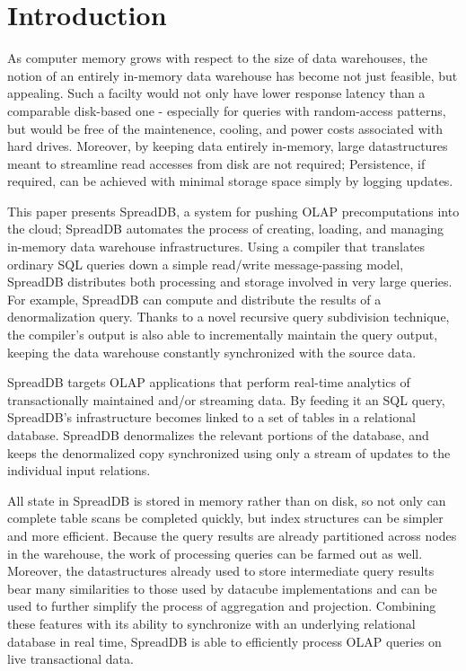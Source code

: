 \section{Introduction}

As computer memory grows with respect to the size of data warehouses, the notion of an entirely in-memory data warehouse has become not just feasible, but appealing.  Such a facilty would not only have lower response latency than a comparable disk-based one - especially for queries with random-access patterns, but would be free of the maintenence\cite{}, cooling\cite{}, and power\cite{1154557} costs associated with hard drives.  Moreover, by keeping data entirely in-memory, large datastructures meant to streamline read accesses from disk are not required; Persistence, if required, can be achieved with minimal storage space simply by logging updates.

This paper presents SpreadDB, a system for pushing OLAP precomputations into the cloud; SpreadDB automates the process of creating, loading, and managing in-memory data warehouse infrastructures.  Using a compiler that translates ordinary SQL queries down a simple read/write message-passing model, SpreadDB distributes both processing and storage involved in very large queries.  For example, SpreadDB can compute and distribute the results of a denormalization query.  Thanks to a novel recursive query subdivision technique, the compiler's output is also able to incrementally maintain the query output, keeping the data warehouse constantly synchronized with the source data.

SpreadDB targets OLAP applications that perform real-time analytics of transactionally maintained and/or streaming data.  By feeding it an SQL query, SpreadDB's infrastructure becomes linked to a set of tables in a relational database.  SpreadDB denormalizes the relevant portions of the database, and keeps the denormalized copy synchronized using only a stream of updates to the individual input relations.  

All state in SpreadDB is stored in memory rather than on disk, so not only can complete table scans be completed quickly, but index structures can be simpler and more efficient.  Because the query results are already partitioned across nodes in the warehouse, the work of processing queries can be farmed out as well.  Moreover, the datastructures already used to store intermediate query results bear many similarities to those used by datacube\cite{datacube} implementations and can be used to further simplify the process of aggregation and projection.  Combining these features with its ability to synchronize with an underlying relational database in real time, SpreadDB is able to efficiently process OLAP queries on live transactional data. 

